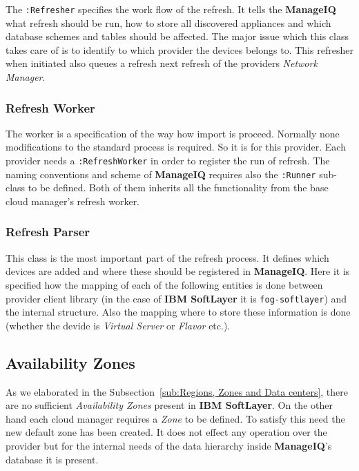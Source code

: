 The \texttt{:Refresher} specifies the work flow of the refresh. It tells the \textbf{ManageIQ} what refresh should be run, how to store all discovered appliances and which database schemes and tables should be affected. The major issue which this class takes care of is to identify to which provider the devices belongs to. This refresher when initiated also queues a refresh next refresh of the providers \emph{Network Manager}.

\subsubsection{Refresh Worker}
\label{subs:Refresh Worker}

The worker is a specification of the way how import is proceed. Normally none modifications to the standard process is required. So it is for this provider. Each provider needs a \texttt{:RefreshWorker} in order to register the run of refresh. The naming conventions and scheme of \textbf{ManageIQ} requires also the \texttt{:Runner} sub-class to be defined. Both of them inherits all the functionality from the base cloud manager's refresh worker.

\subsubsection{Refresh Parser}
\label{subs:Refresh Parser}

This class is the most important part of the refresh process. It defines which devices are added and where these should be registered in \textbf{ManageIQ}. Here it is specified how the mapping of each of the following entities is done between provider client library (in the case of \textbf{IBM SoftLayer} it is \texttt{fog-softlayer}) and the internal structure. Also the mapping where to store these information is done (whether the devide is \emph{Virtual Server} or \emph{Flavor} etc.).

\subsection{Availability Zones}
\label{sub:Availability Zones}

As we elaborated in the Subsection~\ref{sub:Regions, Zones and Data centers}, there are no sufficient \emph{Availability Zones} present in \textbf{IBM SoftLayer}. On the other hand each cloud manager requires a \emph{Zone} to be defined. To satisfy this need the new default zone has been created. It does not effect any operation over the provider but for the internal needs of the data hierarchy inside \textbf{ManageIQ}'s database it is present.

